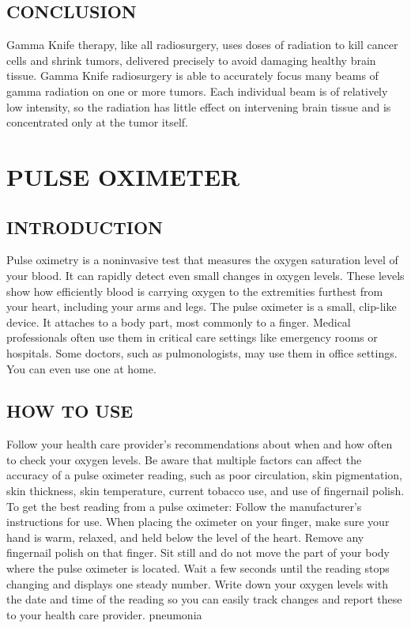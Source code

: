 \documentclass[12pt]{article}
\begin{document}
\subsection{CONCLUSION}
Gamma Knife therapy, like all radiosurgery, uses doses of radiation to kill cancer cells and shrink tumors, delivered precisely to avoid damaging healthy brain tissue. Gamma Knife radiosurgery is able to accurately focus many beams of gamma radiation on one or more tumors. Each individual beam is of relatively low intensity, so the radiation has little effect on intervening brain tissue and is concentrated only at the tumor itself.




 
 
 \section{PULSE OXIMETER}


\subsection{INTRODUCTION}
Pulse oximetry is a noninvasive test that measures the oxygen saturation level of your blood.
It can rapidly detect even small changes in oxygen levels. These levels show how efficiently blood is carrying oxygen to the extremities furthest from your heart, including your arms and legs.
The pulse oximeter is a small, clip-like device. It attaches to a body part, most commonly to a finger.
Medical professionals often use them in critical care settings like emergency rooms or hospitals. Some doctors, such as pulmonologists, may use them in office settings. You can even use one at home.


\subsection{HOW TO USE}
Follow your health care provider’s recommendations about when and how often to check your oxygen levels.
Be aware that multiple factors can affect the accuracy of a pulse oximeter reading, such as poor circulation, skin pigmentation, skin thickness, skin temperature, current tobacco use, and use of fingernail polish. To get the best reading from a pulse oximeter:
Follow the manufacturer’s instructions for use.
When placing the oximeter on your finger, make sure your hand is warm, relaxed, and held below the level of the heart. Remove any fingernail polish on that finger.
Sit still and do not move the part of your body where the pulse oximeter is located.
Wait a few seconds until the reading stops changing and displays one steady number.
Write down your oxygen levels with the date and time of the reading so you can easily track changes and report these to your health care provider.
pneumonia
\end{document}
